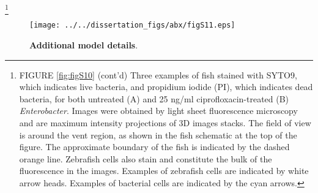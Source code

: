 {{{{{{\let\thefootnote\relax\footnote{FIGURE \ref{fig:figS10} (cont'd) Three examples of fish stained with SYTO9, which indicates live bacteria, and propidium iodide (PI), which indicates dead bacteria, for both untreated (A) and 25 ng/ml ciprofloxacin-treated (B) \textit{Enterobacter}. Images were obtained by light sheet fluorescence microscopy and are maximum intensity projections of 3D images stacks. The field of view is around the vent region, as shown in the fish schematic at the top of the figure. The approximate boundary of the fish is indicated by the dashed orange line. Zebrafish cells also stain and constitute the bulk of the fluorescence in the images. Examples of zebrafish cells are indicated by white arrow heads. Examples of bacterial cells are indicated by the cyan arrows.}
	

\begin{figure}[H]
	\centerline{
		\texttt{[image: ../../dissertation\_figs/abx/figS11.eps]}} 
	\caption{\textbf{Additional model details}.}
	\label{fig:figS11}
\end{figure}

}}}}}}
